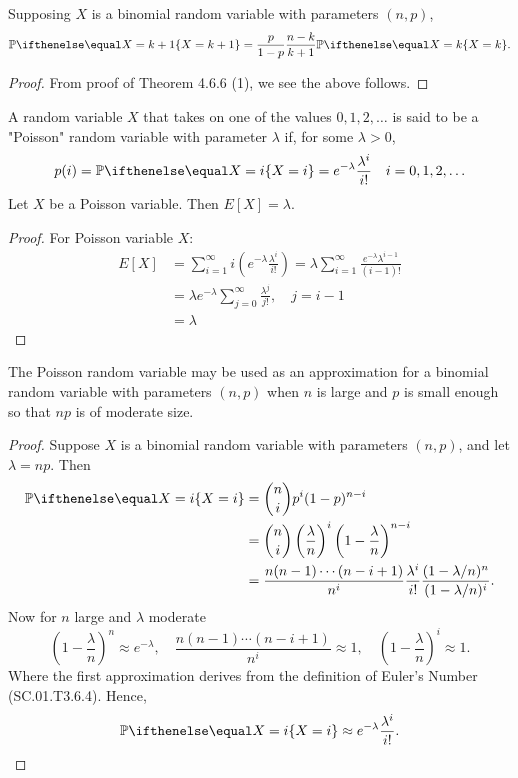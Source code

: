 \documentclass[a4paper,8pt]{article}
\begin{document}
\begin{outline}
    Supposing \(X\) is a binomial random variable with parameters \((n,p)\),
    \[ \bbp[X=k+1] = \frac{p}{1-p}\frac{n-k}{k+1}\bbp[X=k]\text{.} \]

    \begin{proof}
      From proof of Theorem 4.6.6 (1), we see the above follows.
    \end{proof}

    A random variable \(X\) that takes on one of the values \(0, 1, 2, \ldots\) is said to be a
    "Poisson" random variable with parameter \(\lambda\) if, for some \(\lambda > 0\), \[ p(i) = \bbp[X=i]
    = e^{-\lambda}\frac{\lambda^i}{i!}\quad i=0,1,2,\ldots \]
      Let \(X\) be a Poisson variable. Then \(E[X] = \lambda\).

      \begin{proof}
        For Poisson variable \(X\):
        \begin{align*}
          E[X] &= \sum_{i=1}^{\infty}i\left(e^{-\lambda}\frac{\lambda^i}{i!}\right)
               = \lambda\sum_{i=1}^{\infty}\frac{e^{-\lambda}\lambda^{i-1}}{(i-1)!} \\
               &= \lambda e^{-\lambda}\sum_{j=0}^{\infty}\frac{\lambda^j}{j!},\quad j=i-1 \\
               &= \lambda
        \end{align*}
      \end{proof}

      The Poisson random variable may be used as an approximation for a binomial random variable with
      parameters \((n,p)\) when \(n\) is large and \(p\) is small enough so that \(np\) is of moderate size.

      \begin{proof}
        Suppose \(X\) is a binomial random variable with parameters \((n,p)\), and let \(\lambda = np\). Then
        \begin{align*}
          \bbp[X=i] &= \binom{n}{i}p^i(1-p)^{n-i} \\
                    &= \binom{n}{i}\left(\frac{\lambda}{n}\right)^i\left(1-\frac{\lambda}{n}\right)^{n-i} \\
                    &= \frac{n(n-1)\cdots(n-i+1)}{n^i}\frac{\lambda^i}{i!}\frac{(1-\lambda/n)^n}{(1-\lambda/n)^i}\text{.}
        \end{align*}
        Now for \(n\) large and \(\lambda\) moderate
        \[
          \left(1-\frac{\lambda}{n}\right)^n \approx e^{-\lambda},\quad
          \frac{n(n-1)\cdots(n-i+1)}{n^i}\approx 1,\quad
          \left(1-\frac{\lambda}{n}\right)^i \approx 1\text{.}
        \]
        Where the first approximation derives from the definition of Euler's Number (SC.01.T3.6.4). Hence,
        \[\bbp[X=i] \approx e^{-\lambda}\frac{\lambda^i}{i!}\text{.} \]
      \end{proof}


\end{outline}
\end{document}
